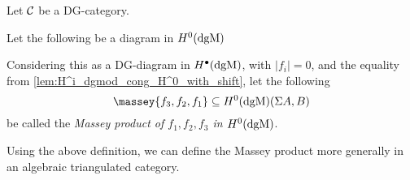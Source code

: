 \begin{definition}
    \label{def:massey_product_H^0(dgMod_dg(C))}
    Let \( {\mathcal{C}} \) be a DG-category.
    
    Let the following be a diagram in \( H^0(\operatorname{dgM}) \)
    \begin{center}
    \end{center}
    Considering this as a DG-diagram in \( H^{\bullet}(\operatorname{dgM}) \), with \( |f_i| = 0 \), and the equality from \autoref{lem:H^i_dgmod_cong_H^0_with_shift}, let the following
    \[
        \massey{f_3, f_2, f_1} \subseteq H^0(\dgM)(\Sigma A, B)
    \]
    be called the \emph{Massey product of \( f_1, f_2, f_3 \) in \( H^0(\operatorname{dgM}) \)}.
\end{definition}

Using the above definition, we can define the Massey product more generally in an algebraic triangulated category.

